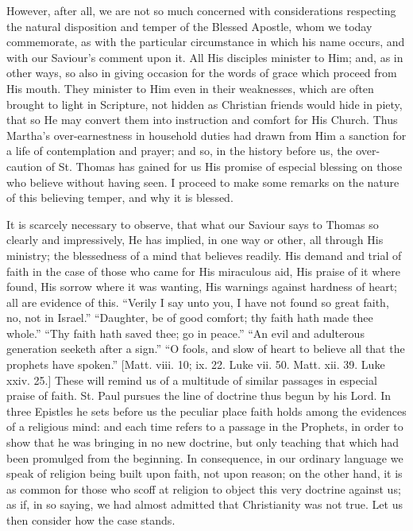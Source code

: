 However, after all, we are not so much concerned with
considerations respecting the natural disposition and temper of the
Blessed Apostle, whom we today commemorate, as with the particular
circumstance in which his name occurs, and with our Saviour's comment
upon it. All His disciples minister to Him; and, as in other ways, so
also in giving occasion for the words of grace which proceed from His
mouth. They minister to Him even in their weaknesses, which are often
brought to light in Scripture, not hidden as Christian friends would
hide in piety, that so He may convert them into instruction and
comfort for His Church. Thus Martha's over-earnestness in household
duties had drawn from Him a sanction for a life of contemplation and
prayer; and so, in the history before us, the over-caution of St.
Thomas has gained for us His promise of especial blessing on those who
believe without having seen. I proceed to make some remarks on the
nature of this believing temper, and why it is blessed.

It is scarcely necessary to observe, that what our Saviour says to
Thomas so clearly and impressively, He has implied, in one way or
other, all through His ministry; the blessedness of a mind that
believes readily. His demand and trial of faith in the case of those
who came for His miraculous aid, His praise of it where found, His
sorrow where it was wanting, His warnings against hardness of heart;
all are evidence of this. ``Verily I say unto you, I have not
found so great faith, no, not in Israel.'' ``Daughter, be of
good comfort; thy faith hath made thee whole.'' ``Thy faith
hath saved thee; go in peace.'' ``An evil and adulterous
generation seeketh after a sign.'' ``O fools, and slow of
heart to believe all that the prophets have spoken.'' [Matt. viii.
10; ix. 22. Luke vii. 50. Matt. xii. 39. Luke xxiv. 25.] These will
remind us of a multitude of similar passages in especial praise of
faith. St. Paul pursues the line of doctrine thus begun by his Lord.
In three Epistles he sets before us the peculiar place faith holds
among the evidences of a religious mind: and each time refers to a
passage in the Prophets, in order to show that he was bringing in no
new doctrine, but only teaching that which had been promulged from the
beginning. In consequence, in our ordinary language we speak of
religion being built upon faith, not upon reason; on the other hand,
it is as common for those who scoff at religion to object this very
doctrine against us; as if, in so saying, we had almost admitted that
Christianity was not true. Let us then consider how the case stands.

